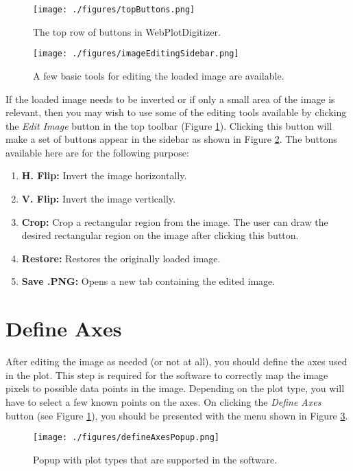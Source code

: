 \documentclass[letterpaper, 10pt]{article}
\begin{document}
\begin{figure}
\begin{center}
\texttt{[image: ./figures/topButtons.png]}
\caption{The top row of buttons in WebPlotDigitizer.}
\label{fig:topButtons}
\end{center}
\end{figure}
\begin{figure}
\begin{center}
\texttt{[image: ./figures/imageEditingSidebar.png]}
\caption{A few basic tools for editing the loaded image are available.}
\label{fig:imageEditingSidebar}
\end{center}
\end{figure}
If the loaded image needs to be inverted or if only a small area of the image is relevant, then you may wish to use some of the editing tools available by clicking the \emph{Edit Image} button in the top toolbar (Figure \ref{fig:topButtons}). Clicking this button will make a set of buttons appear in the sidebar as shown in Figure \ref{fig:imageEditingSidebar}. The buttons available here are for the following purpose:
\begin{enumerate}
\item{{\bf H. Flip:} Invert the image horizontally.}
\item{{\bf V. Flip:} Invert the image vertically.}
\item{{\bf Crop:} Crop a rectangular region from the image. The user can draw the desired rectangular region on the image after clicking this button.}
\item{{\bf Restore: } Restores the originally loaded image.}
\item{{\bf Save .PNG:} Opens a new tab containing the edited image.}
 
\end{enumerate}







\section{Define Axes}

After editing the image as needed (or not at all),  you should define the axes used in the plot. This step is required for the software to correctly map the image pixels to possible data points in the image. Depending on the plot type, you will have to select a few known points on the axes. On clicking the \emph{Define Axes} button (see Figure \ref{fig:topButtons}), you should be presented with the menu shown in Figure \ref{fig:defineAxesPopup}.
\begin{figure}
\begin{center}
\texttt{[image: ./figures/defineAxesPopup.png]}
\caption{Popup with plot types that are supported in the software.}
\label{fig:defineAxesPopup}
\end{center}
\end{figure}
\end{document}
